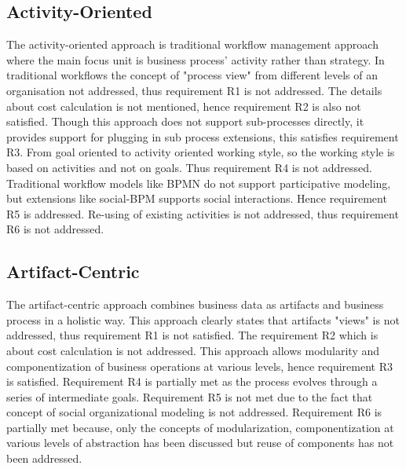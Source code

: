 \subsection{Activity-Oriented} 
The activity-oriented approach \cite{Reijers2006} is traditional workflow management approach where the main focus unit is business process' activity rather than strategy. In traditional workflows the concept of "process view" from different levels of an organisation not addressed, thus requirement R1 is not addressed. The details about cost calculation is not mentioned, hence requirement R2 is also not satisfied. Though this approach does not support sub-processes directly, it provides support for plugging in sub process extensions, this satisfies requirement R3. From goal oriented to activity oriented working style, so the working style is based on activities and not on goals. Thus requirement R4 is not addressed. Traditional workflow models like BPMN do not support participative modeling, but extensions like social-BPM supports social interactions. Hence requirement R5 is addressed. Re-using of existing activities is not addressed, thus requirement R6 is not addressed.  

\subsection{Artifact-Centric} 
The artifact-centric approach \cite{Cohn2009} combines business data as artifacts and business process in a holistic way. This approach clearly states that artifacts "views" is not addressed, thus requirement R1 is not satisfied. The requirement R2 which is about cost calculation is not addressed. This approach allows modularity and componentization of business operations at various levels, hence requirement R3 is satisfied. Requirement R4  is partially met as the process evolves through a series of intermediate goals. Requirement R5 is not met due to the fact that concept of social organizational modeling is not addressed. Requirement R6 is partially met because, only the concepts of modularization, componentization at various levels of abstraction has been discussed but reuse of components has not been addressed.

